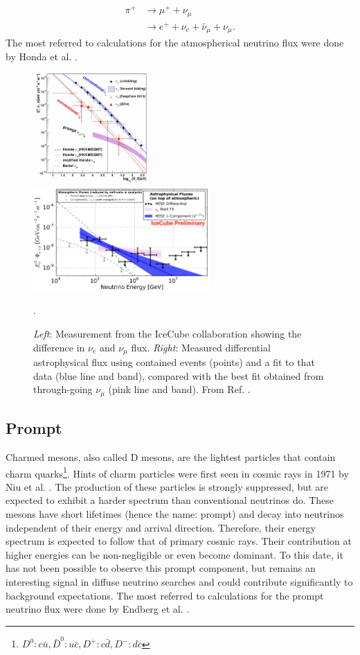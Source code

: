 \begin{align}
\pi^+ &\rightarrow \mu^+ + \nu_\mu \nonumber \\
& \rightarrow e^+ + \nu_e + \bar{\nu}_\mu + \nu_\mu.
\end{align}
The most referred to calculations for the atmospherical neutrino flux were done by Honda et al. \cite{Honda:2006qj}.
\begin{figure}[t]
\centering
\includegraphics[width=0.39\textwidth]{chapter3/img/neutrinospectrum2.png}
\includegraphics[width=0.6\textwidth]{chapter3/img/astroflux.png}
\caption{\textit{Left}: Measurement from the IceCube collaboration showing the difference in $\nu_e$ and $\nu_\mu$ flux. \textit{Right}: Measured differential astrophysical flux using contained events (points) and a fit to that data (blue line and band), compared with the best fit obtained from through-going $\nu_\mu$ (pink line and band). From Ref. \cite{Aartsen:2017mau}.}.
\label{fig:neutrinospectrum2}
\end{figure}

\subsection{Prompt}
Charmed mesons, also called D mesons, are the lightest particles that contain charm quarks\footnote{$D^0: c\bar{u}, \bar{D}^0: u\bar{c}, D^+: c\bar{d}, D^-: d\bar{c}$}. Hints of charm particles were first seen in cosmic rays in 1971 by Niu et al. \cite{doi:10.1143/PTP.46.1644}. The production of these particles is strongly suppressed, but are expected to exhibit a harder spectrum than conventional neutrinos do. These mesons have short lifetimes (hence the name: prompt) and decay into neutrinos independent of their energy and arrival direction. Therefore, their energy spectrum is expected to follow that of primary cosmic rays. Their contribution at higher energies can be non-negligible or even become dominant. To this date, it has not been possible to observe this prompt component, but remains an interesting signal in diffuse neutrino searches and could contribute significantly to background expectations.  The most referred to calculations for the prompt neutrino flux were done by Endberg et al. \cite{Enberg:2008te}.
